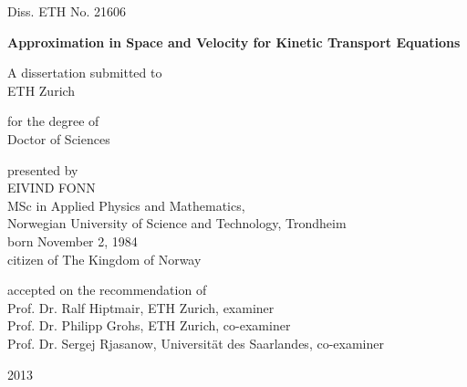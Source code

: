 \thispagestyle{empty}

{
\centering

Diss. ETH No. 21606

\vspace{1cm}

\begin{huge}
{\bf \sffamily Approximation in Space and Velocity
 for Kinetic Transport Equations }
\end{huge}

\vspace{1cm}

A dissertation submitted to \\[3pt]
ETH Zurich

\vspace{0.5cm}

for the degree of\\[3pt]
Doctor of Sciences

\vspace{0.5cm}

presented by\\[6pt]
EIVIND FONN\\[6pt]
MSc in Applied Physics and Mathematics,\\Norwegian University of Science and Technology, Trondheim\\[6pt]
born November 2, 1984\\[3pt]
citizen of The Kingdom of Norway

\vspace{0.5cm}

accepted on the recommendation of\\[3pt]
Prof. Dr. Ralf Hiptmair, ETH Zurich, examiner\\[3pt]
Prof. Dr. Philipp Grohs, ETH Zurich, co-examiner\\[3pt]
Prof. Dr. Sergej Rjasanow, Universit\"at des Saarlandes, co-examiner

\vspace{0.5cm}

\vfill

2013

}

\newpage
